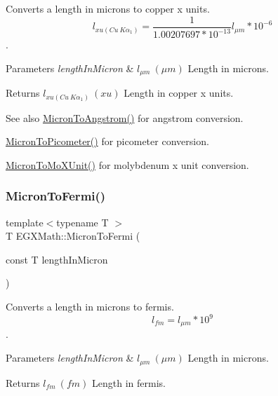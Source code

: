 Converts a length in microns to copper x units. \[ l_{xu(Cu\ K\alpha_1)}= \frac{1}{1.00207697*10^{-13}} l_{\mu m} * 10^{-6}\]. 


\begin{DoxyParams}{Parameters}
{\em length\+In\+Micron} & $ l_{\mu m}\ (\mu m)$ Length in microns. \\
\hline
\end{DoxyParams}
\begin{DoxyReturn}{Returns}
$ l_{xu(Cu\ K\alpha_1)}\ (xu)$ Length in copper x units. 
\end{DoxyReturn}
\begin{DoxySeeAlso}{See also}
\mbox{\hyperlink{group___e_g_x_math-_conversions-_length_conversions-_non-_s_i-_micron-_non-_s_i_ga34f8c07bfb65b584298dd7be114b85ad}{Micron\+To\+Angstrom()}} for angstrom conversion. 

\mbox{\hyperlink{group___e_g_x_math-_conversions-_length_conversions-_non-_s_i-_micron-_s_i_ga6e091e653fd9efb8769cc131fcbc41bc}{Micron\+To\+Picometer()}} for picometer conversion. 

\mbox{\hyperlink{group___e_g_x_math-_conversions-_length_conversions-_non-_s_i-_micron-_non-_s_i_ga4bdfec28657cb037fc0830a95ceb79ca}{Micron\+To\+Mo\+X\+Unit()}} for molybdenum x unit conversion. 
\end{DoxySeeAlso}
\mbox{\label{group___e_g_x_math-_conversions-_length_conversions-_non-_s_i-_micron-_non-_s_i_ga15284641d32129d8a82d4e50eaea346d}} 
\subsubsection{\texorpdfstring{Micron\+To\+Fermi()}{MicronToFermi()}}
{\footnotesize\ttfamily template$<$typename T $>$ \\
T E\+G\+X\+Math\+::\+Micron\+To\+Fermi (\begin{DoxyParamCaption}\item[{const T}]{length\+In\+Micron }\end{DoxyParamCaption})}



Converts a length in microns to fermis. \[ l_{fm}=l_{\mu m} * 10^{9} \]. 


\begin{DoxyParams}{Parameters}
{\em length\+In\+Micron} & $ l_{\mu m}\ (\mu m)$ Length in microns. \\
\hline
\end{DoxyParams}
\begin{DoxyReturn}{Returns}
$ l_{fm}\ (fm)$ Length in fermis. 
\end{DoxyReturn}
\mbox{\label{group___e_g_x_math-_conversions-_length_conversions-_non-_s_i-_micron-_non-_s_i_ga4bdfec28657cb037fc0830a95ceb79ca}} 
